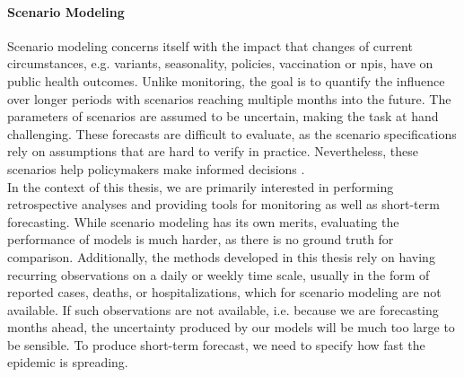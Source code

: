 \paragraph{Scenario Modeling}
Scenario modeling concerns itself with the impact that changes of current circumstances, e.g. variants, seasonality, policies, vaccination or \glspl{npi}, have on public health outcomes. Unlike monitoring, the goal is to quantify the influence over longer periods with scenarios reaching multiple months into the future. The parameters of scenarios are assumed to be uncertain, making the task at hand challenging. These forecasts are difficult to evaluate, as the scenario specifications rely on assumptions that are hard to verify in practice. Nevertheless, these scenarios help policymakers make informed decisions \citep{Borchering2023Public}.\\[20pt]
%
In the context of this thesis, we are primarily interested in performing retrospective analyses and providing tools for monitoring as well as short-term forecasting. While scenario modeling has its own merits, evaluating the performance of models is much harder, as there is no ground truth for comparison. Additionally, the methods developed in this thesis rely on having recurring observations on a daily or weekly time scale, usually in the form of reported cases, deaths, or hospitalizations, which for scenario modeling are not available. If such observations are not available, i.e. because we are forecasting months ahead, the uncertainty produced by our models will be much too large to be sensible. To produce short-term forecast, we need to specify how fast the epidemic is spreading.